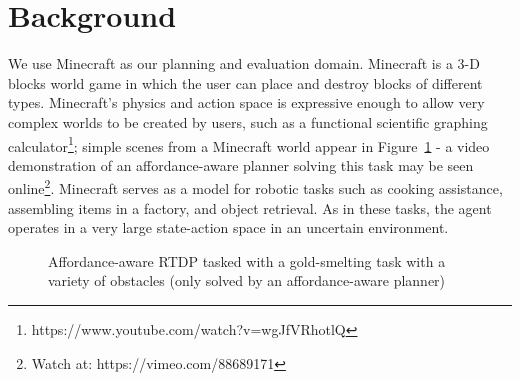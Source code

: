 \documentclass[conference]{IEEEtran}
\begin{document}
\section{Background}
\label{sec:background}
We use Minecraft as our planning and evaluation domain. Minecraft is a
3-D blocks world game in which the user can place and destroy blocks
of different types.  Minecraft's physics and action space is expressive
enough to allow very complex worlds to be created by users, such as a
functional scientific graphing calculator\footnote{https://www.youtube.com/watch?v=wgJfVRhotlQ};
simple scenes from a Minecraft world appear in Figure~\ref{fig:epicworld} - a video demonstration of
an affordance-aware planner solving this task may be seen online\footnote{Watch at: https://vimeo.com/88689171}.
Minecraft serves as a model for robotic tasks such as cooking assistance, assembling items in a factory, 
and object retrieval.  As in these tasks, the agent operates in a very large state-action space in an uncertain environment.

\begin{figure}
\centering
{}%
%
%
%
  \caption{Affordance-aware RTDP tasked with a gold-smelting task with a variety of obstacles
  (only solved by an affordance-aware planner)}
  \label{fig:epicworld}
\end{figure}
\end{document}
